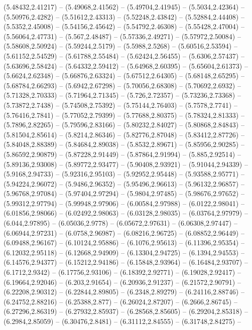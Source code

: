 {(5.48432,2.41217) -- (5.49068,2.41562) -- (5.49704,2.41945) -- (5.5034,2.42364) -- (5.50976,2.4282) -- (5.51612,2.43313) -- (5.52248,2.43842) -- (5.52884,2.44408) -- (5.5352,2.45008) -- (5.54156,2.45642) -- (5.54792,2.46308) -- (5.55428,2.47004) --
(5.56064,2.47731) -- (5.567,2.48487) -- (5.57336,2.49271) -- (5.57972,2.50084) -- (5.58608,2.50924) -- (5.59244,2.5179) -- (5.5988,2.5268) -- (5.60516,2.53594) -- (5.61152,2.54529) -- (5.61788,2.55484) -- (5.62424,2.56455) -- (5.6306,2.57437) --
(5.63696,2.58424) -- (5.64332,2.59412) -- (5.64968,2.60395) -- (5.65604,2.61373) -- (5.6624,2.62348) -- (5.66876,2.63324) -- (5.67512,2.64305) -- (5.68148,2.65295) -- (5.68784,2.66293) -- (5.6942,2.67298) -- (5.70056,2.68308) -- (5.70692,2.6932) --
(5.71328,2.70333) -- (5.71964,2.71345) -- (5.726,2.72357) -- (5.73236,2.73368) -- (5.73872,2.7438) -- (5.74508,2.75392) -- (5.75144,2.76403) -- (5.7578,2.7741) -- (5.76416,2.7841) -- (5.77052,2.79399) -- (5.77688,2.80375) -- (5.78324,2.81333) --
(5.7896,2.82265) -- (5.79596,2.83166) -- (5.80232,2.84027) -- (5.80868,2.84843) -- (5.81504,2.85614) -- (5.8214,2.86346) -- (5.82776,2.87048) -- (5.83412,2.87726) -- (5.84048,2.88389) -- (5.84684,2.89038) -- (5.8532,2.89671) -- (5.85956,2.90285) --
(5.86592,2.90879) -- (5.87228,2.91449) -- (5.87864,2.91994) -- (5.885,2.92514) -- (5.89136,2.93008) -- (5.89772,2.93477) -- (5.90408,2.93921) -- (5.91044,2.94339) -- (5.9168,2.94733) -- (5.92316,2.95103) -- (5.92952,2.95448) -- (5.93588,2.95771) --
(5.94224,2.96072) -- (5.9486,2.96352) -- (5.95496,2.96613) -- (5.96132,2.96857) -- (5.96768,2.97084) -- (5.97404,2.97294) -- (5.9804,2.97485) -- (5.98676,2.97652) -- (5.99312,2.97794) -- (5.99948,2.97906) -- (6.00584,2.97988) -- (6.0122,2.98041) --
(6.01856,2.98066) -- (6.02492,2.98063) -- (6.03128,2.98035) -- (6.03764,2.97979) -- (6.044,2.97895) -- (6.05036,2.9778) -- (6.05672,2.97631) -- (6.06308,2.97447) -- (6.06944,2.97231) -- (6.0758,2.96987) -- (6.08216,2.96725) -- (6.08852,2.96449) --
(6.09488,2.96167) -- (6.10124,2.95886) -- (6.1076,2.95613) -- (6.11396,2.95354) -- (6.12032,2.95118) -- (6.12668,2.94909) -- (6.13304,2.94725) -- (6.1394,2.94553) -- (6.14576,2.94377) -- (6.15212,2.94186) -- (6.15848,2.93964) -- (6.16484,2.93707) --
(6.1712,2.9342) -- (6.17756,2.93106) -- (6.18392,2.92771) -- (6.19028,2.92417) -- (6.19664,2.92046) -- (6.203,2.91654) -- (6.20936,2.91237) -- (6.21572,2.90791) -- (6.22208,2.90312) -- (6.22844,2.89805) -- (6.2348,2.89279) -- (6.24116,2.88746) --
(6.24752,2.88216) -- (6.25388,2.877) -- (6.26024,2.87207) -- (6.2666,2.86745) -- (6.27296,2.86319) -- (6.27932,2.85937) -- (6.28568,2.85605) -- (6.29204,2.85318) -- (6.2984,2.85059) -- (6.30476,2.8481) -- (6.31112,2.84555) -- (6.31748,2.84275) --
}
